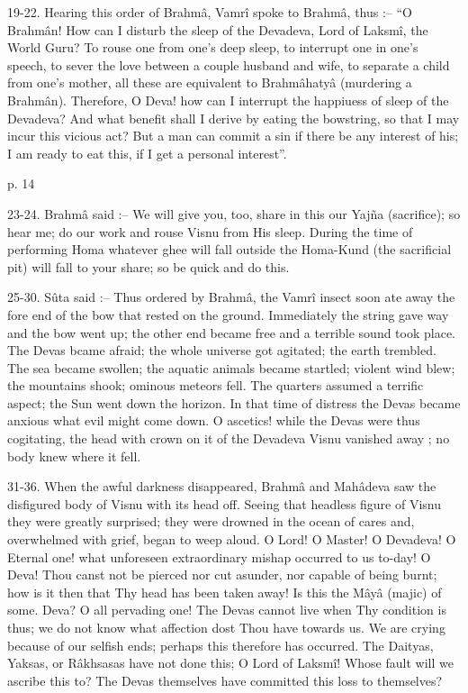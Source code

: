  

19-22. Hearing this order of Brahmâ, Vamrî spoke to Brahmâ, thus :-- “O Brahmân! How can I disturb the sleep of the Devadeva, Lord of Laksmî, the World Guru? To rouse one from one's deep sleep, to interrupt one in one's speech, to sever the love between a couple husband and wife, to separate a child from one's mother, all these are equivalent to Brahmâhatyâ (murdering a Brahmân). Therefore, O Deva! how can I interrupt the happiuess of sleep of the Devadeva? And what benefit shall I derive by eating the bowstring, so that I may incur this vicious act? But a man can commit a sin if there be any interest of his; I am ready to eat this, if I get a personal interest”.

 

p. 14

 

23-24. Brahmâ said :-- We will give you, too, share in this our Yajña (sacrifice); so hear me; do our work and rouse Visnu from His sleep. During the time of performing Homa whatever ghee will fall outside the Homa-Kund (the sacrificial pit) will fall to your share; so be quick and do this.

 

25-30. Sûta said :-- Thus ordered by Brahmâ, the Vamrî insect soon ate away the fore end of the bow that rested on the ground. Immediately the string gave way and the bow went up; the other end became free and a terrible sound took place. The Devas bcame afraid; the whole universe got agitated; the earth trembled. The sea became swollen; the aquatic animals became startled; violent wind blew; the mountains shook; ominous meteors fell. The quarters assumed a terrific aspect; the Sun went down the horizon. In that time of distress the Devas became anxious what evil might come down. O ascetics! while the Devas were thus cogitating, the head with crown on it of the Devadeva Visnu vanished away ; no body knew where it fell.

 

31-36. When the awful darkness disappeared, Brahmâ and Mahâdeva saw the disfigured body of Visnu with its head off. Seeing that headless figure of Visnu they were greatly surprised; they were drowned in the ocean of cares and, overwhelmed with grief, began to weep aloud. O Lord! O Master! O Devadeva! O Eternal one! what unforeseen extraordinary mishap occurred to us to-day! O Deva! Thou canst not be pierced nor cut asunder, nor capable of being burnt; how is it then that Thy head has been taken away! Is this the Mâyâ (majic) of some. Deva? O all pervading one! The Devas cannot live when Thy condition is thus; we do not know what affection dost Thou have towards us. We are crying because of our selfish ends; perhaps this therefore has occurred. The Daityas, Yaksas, or Râkhsasas have not done this; O Lord of Laksmî! Whose fault will we ascribe this to? The Devas themselves have committed this loss to themselves?

